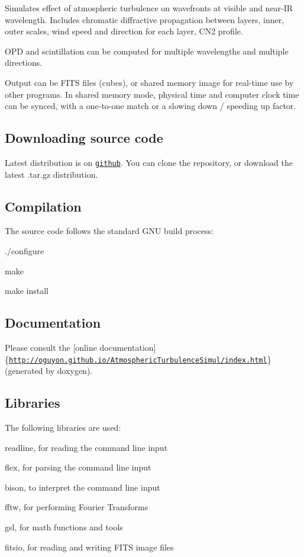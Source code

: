 Simulates effect of atmospheric turbulence on wavefronts at visible and near-\/\+I\+R wavelength. Includes chromatic diffractive propagation between layers, inner, outer scales, wind speed and direction for each layer, C\+N2 profile.

O\+P\+D and scintillation can be computed for multiple wavelengths and multiple directions.

Output can be F\+I\+T\+S files (cubes), or shared memory image for real-\/time use by other programs. In shared memory mode, physical time and computer clock time can be synced, with a one-\/to-\/one match or a slowing down / speeding up factor.

\subsection*{Downloading source code}

Latest distribution is on \href{https://github.com/oguyon/}{\tt github}. You can clone the repository, or download the latest .tar.\+gz distribution.

\subsection*{Compilation}

The source code follows the standard G\+N\+U build process\+:

./configure

make

make install

\subsection*{Documentation}

Please consult the \mbox{[}online documentation\mbox{]}\{\href{http://oguyon.github.io/AtmosphericTurbulenceSimul/index.html}{\tt http\+://oguyon.\+github.\+io/\+Atmospheric\+Turbulence\+Simul/index.\+html}\} (generated by doxygen).

\subsection*{Libraries}

The following libraries are used\+:
\begin{DoxyItemize}
\item readline, for reading the command line input
\item flex, for parsing the command line input
\item bison, to interpret the command line input
\item fftw, for performing Fourier Transforms
\item gsl, for math functions and tools
\item fitsio, for reading and writing F\+I\+T\+S image files
\end{DoxyItemize}

